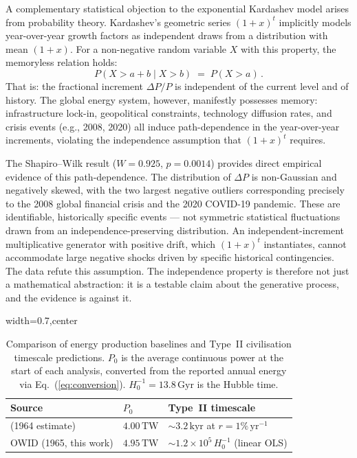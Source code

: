 \documentclass[final,5p,times,twocolumn,authoryear]{elsarticle}
\begin{document}
A complementary statistical objection to the exponential Kardashev model
arises from probability theory. Kardashev's geometric series $(1+x)^t$ 
implicitly models year-over-year growth factors as independent draws 
from a distribution with mean $(1+x)$. For a non-negative random variable 
$X$ with this property, the memoryless relation holds:
\begin{equation}
    P(X > a + b \mid X > b) \;=\; P(X > a)\,.
    \label{eq:memoryless}
\end{equation}
That is: the fractional increment $\Delta P / P$ is independent of
the current level and of history. The global energy system, however, 
manifestly possesses memory: infrastructure lock-in, geopolitical 
constraints, technology diffusion rates, and crisis events (e.g., 2008, 2020) 
all induce path-dependence in the year-over-year increments, violating 
the independence assumption that $(1+x)^t$ requires.
 
The Shapiro--Wilk result ($W = 0.925$, $p = 0.0014$) provides direct
empirical evidence of this path-dependence. The distribution of $\Delta P$
is non-Gaussian and negatively skewed, with the two largest negative outliers
corresponding precisely to the 2008 global financial crisis and the 2020
COVID-19 pandemic. These are identifiable, historically specific events ---
not symmetric statistical fluctuations drawn from an independence-preserving 
distribution. An independent-increment multiplicative generator with positive 
drift, which $(1+x)^t$ instantiates, cannot accommodate large negative shocks 
driven by specific historical contingencies. The data refute this assumption. 
The independence property is therefore not just a mathematical abstraction: 
it is a testable claim about the generative process, and the evidence is 
against it.


\begin{table}[t]
\centering
\caption{Comparison of energy production baselines and Type~II
civilisation timescale predictions. $P_0$ is the average
continuous power at the start of each analysis, converted from
the reported annual energy via Eq.~(\ref{eq:conversion}).
$H_0^{-1} = 13.8\,\mathrm{Gyr}$ is the Hubble time.}
\label{kard_comp}
\begin{adjustbox}{width=0.7\textwidth,center}
\begin{tabular}{lll}
\toprule
Source & $P_0$ & Type~II timescale \\
\midrule
\citet{kar64} (1964 estimate) & $4.00\,\mathrm{TW}$ & $\sim 3.2\,\mathrm{kyr}$ at $r=1\%\,\mathrm{yr}^{-1}$ \\
OWID \citep{Ritchie2022} (1965, this work) & $4.95\,\mathrm{TW}$ & $\sim 1.2 \times 10^5\,H_0^{-1}$ (linear OLS) \\
\bottomrule
\end{tabular}
\end{adjustbox}
\end{table}
 
\end{document}
